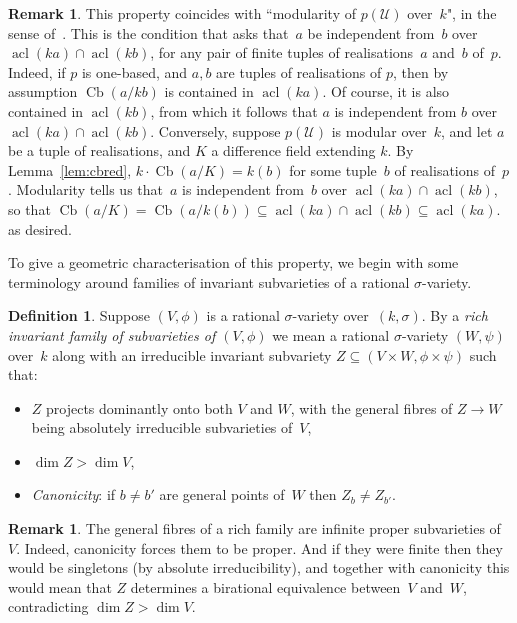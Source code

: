\documentclass[\DocOpts]{amsart}
\theoremstyle{definition}
\newtheorem{remark}[theorem]{Remark}
\newtheorem{definition}[theorem]{Definition}
\def\cb{\operatorname{Cb}}
\def\acl{\operatorname{acl}}
\def\U{\mathcal{U}}
\newcommand{\<}{\langle}
\renewcommand{\>}{\rangle}
\begin{document}
\begin{remark}\label{rem:modular}
  This property coincides with ``modularity of $p(\U)$ over~$k$", in the sense 
  of~\cite[\S3.3]{acfa}.
  This is the condition that asks that~\(a\) be independent from~\(b\) over \(\acl(ka)\cap\acl(kb)\), for any pair of finite tuples of realisations~$a$ and~$b$ of~$p$.
    Indeed, if \(p\) is one-based, and \(a, b\) 
  are tuples of realisations of \(p\), then by assumption \(\cb(a/kb)\) is 
  contained in \(\acl(ka)\).
  Of course, it is also contained in 
  \(\acl(kb)\), from which it follows that \(a\) is independent from 
  \(b\) over \(\acl(ka)\cap\acl(kb)\).
  Conversely, suppose \(p(\U)\) is modular over~$k$, and let \(a\) be a tuple of realisations, and 
  \(K\) a difference field extending \(k\).
  By Lemma~\ref{lem:cbred}, 
  \(k\cdot\cb(a/K)=k(b)\) for some tuple~\(b\) of realisations of~\(p\).  
  Modularity tells us that~$a$ is independent from~$b$ over $\acl(ka)\cap\acl(kb)$,
  so that
  \(\cb(a/K)=\cb(a/k(b))\subseteq\acl(ka)\cap\acl(kb)\subseteq\acl(ka)\).
  as desired.
\end{remark}

To give a geometric characterisation of this property, we begin with some terminology around families of invariant subvarieties of a 
rational $\sigma$-variety.

\begin{definition}\label{def:rich}
Suppose $(V,\phi)$ is a rational $\sigma$-variety over~$(k,\sigma)$.
By a \emph{rich invariant family of subvarieties of $(V,\phi)$} we mean a rational $\sigma$-variety $(W,\psi)$ over~$k$ along with an irreducible invariant subvariety $Z\subseteq(V\times W,\phi\times\psi)$ such that:
\begin{itemize}
\item[(i)]
$Z$ projects dominantly onto both $V$ and $W$, with the general fibres of $Z\to W$ being absolutely irreducible subvarieties of~$V$,
\item[(ii)]
$\dim Z>\dim V$,
\item[(iii)]
\emph{Canonicity}: if $b\neq b'$ are general points of~$W$ then $Z_b\neq Z_{b'}$.\end{itemize}
\end{definition}

\begin{remark}
The general fibres of a rich family are infinite proper subvarieties of~$V$.
Indeed, canonicity forces them to be proper.
And if they were finite then they would be singletons (by absolute irreducibility), and together with canonicity this would mean that $Z$ determines a birational equivalence between~$V$ and~$W$, contradicting $\dim Z>\dim V$.
\end{remark}
\end{document}
